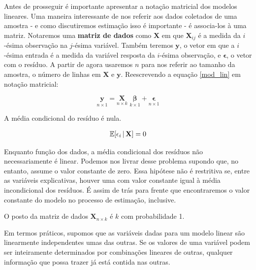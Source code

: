 Antes de prosseguir é importante apresentar a notação matricial dos modelos lineares. Uma maneira interessante de nos referir aos dados coletados de uma amostra - e como discutiremos estimação isso é importante - é associa-los à uma matriz. Notaremos uma \textbf{matriz de dados} como $\mathbf{X}$ em que $\mathbf{X}_{ij}$ é a medida da $i$-ésima observação na $j$-ésima variável. Também teremos $\mathbf{y}$, o vetor em que a $i$-ésima entrada é a medida da variável resposta da $i$-ésima observação, e $\mathbf{\epsilon}$, o vetor com o resíduo. A partir de agora usaremos $n$ para nos referir ao tamanho da amostra, o número de linhas em $\mathbf{X}$ e $\mathbf{y}$. Reescrevendo a equação \ref{mod_lin} em notação matricial:

\begin{equation}
    \underset{n \times 1}{\mathbf{y}} = \underset{n \times k}{\mathbf{X}} \,\, \underset{k \times 1}{\boldsymbol{\beta}}   + \underset{n \times 1}{\boldsymbol{\epsilon}}
\end{equation}



\begin{hipotese}
A média condicional do resíduo é nula.

\begin{align}
    \mathbb{E}[\epsilon_i \, | \, \mathbf{X}] = 0
\end{align}

Enquanto função dos dados, a média condicional dos resíduos não necessariamente é linear. Podemos nos livrar desse problema supondo que, no entanto, assume o valor constante de zero. Essa hipótese não é restritiva se, entre as variáveis explicativas, houver uma com valor constante igual à média incondicional dos resíduos. É assim de trás para frente que encontraremos o valor constante do modelo no processo de estimação, inclusive. 

\end{hipotese}

\begin{hipotese}
O posto da matriz de dados $\mathbf{X}_{n \times k}$ é $k$ com probabilidade 1.
\end{hipotese}

Em termos práticos, supomos que as variáveis dadas para um modelo linear são linearmente independentes umas das outras. Se os valores de uma variável podem ser inteiramente determinados por combinações lineares de outras, qualquer informação que possa trazer já está contida nas outras.

